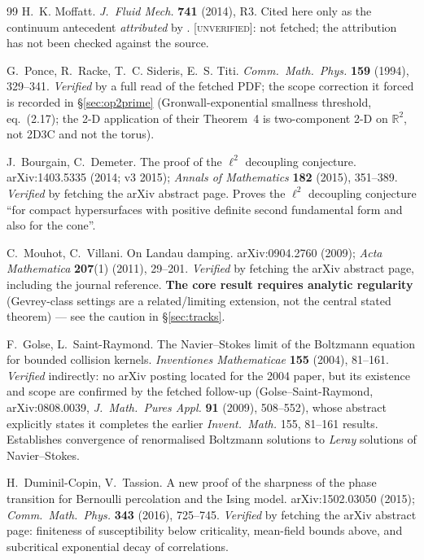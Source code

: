 \documentclass[11pt,a4paper]{article}
\newcommand{\R}{\mathbb{R}}
\theoremstyle{definition}
\theoremstyle{plain}
\begin{document}
\begin{thebibliography}{99}
H.~K. Moffatt.
\newblock \emph{J.~Fluid Mech.} \textbf{741} (2014), R3.
\newblock Cited here only as the continuum antecedent \emph{attributed} by
\cite{biferale-buzzicotti-linkmann}. \textsc{[unverified]}: not fetched; the attribution has not
been checked against the source.

G.~Ponce, R.~Racke, T.~C. Sideris, E.~S. Titi.
\newblock \emph{Comm.\ Math.\ Phys.} \textbf{159} (1994), 329--341.
\newblock \emph{Verified} by a full read of the fetched PDF; the scope correction it forced is
recorded in \S\ref{sec:op2prime} (Gronwall-exponential smallness threshold, eq.~(2.17); the 2-D
application of their Theorem~4 is two-component 2-D on $\R^2$, not 2D3C and not the torus).

J.~Bourgain, C.~Demeter.
\newblock The proof of the $\ell^2$ decoupling conjecture.
\newblock arXiv:1403.5335 (2014; v3 2015); \emph{Annals of Mathematics} \textbf{182} (2015),
351--389.
\newblock \emph{Verified} by fetching the arXiv abstract page. Proves the $\ell^2$ decoupling
conjecture ``for compact hypersurfaces with positive definite second fundamental form and
also for the cone''.

C.~Mouhot, C.~Villani.
\newblock On Landau damping.
\newblock arXiv:0904.2760 (2009); \emph{Acta Mathematica} \textbf{207}(1) (2011), 29--201.
\newblock \emph{Verified} by fetching the arXiv abstract page, including the journal
reference. \textbf{The core result requires analytic regularity} (Gevrey-class settings are
a related/limiting extension, not the central stated theorem) --- see the caution in
\S\ref{sec:tracks}.

F.~Golse, L.~Saint-Raymond.
\newblock The Navier--Stokes limit of the Boltzmann equation for bounded collision kernels.
\newblock \emph{Inventiones Mathematicae} \textbf{155} (2004), 81--161.
\newblock \emph{Verified} indirectly: no arXiv posting located for the 2004 paper, but its
existence and scope are confirmed by the fetched follow-up (Golse--Saint-Raymond,
arXiv:0808.0039, \emph{J.\ Math.\ Pures Appl.} \textbf{91} (2009), 508--552), whose abstract
explicitly states it completes the earlier \emph{Invent.\ Math.} 155, 81--161 results.
Establishes convergence of renormalised Boltzmann solutions to \emph{Leray} solutions of
Navier--Stokes.

H.~Duminil-Copin, V.~Tassion.
\newblock A new proof of the sharpness of the phase transition for Bernoulli percolation and
the Ising model.
\newblock arXiv:1502.03050 (2015); \emph{Comm.\ Math.\ Phys.} \textbf{343} (2016), 725--745.
\newblock \emph{Verified} by fetching the arXiv abstract page: finiteness of susceptibility
below criticality, mean-field bounds above, and subcritical exponential decay of
correlations.


\end{thebibliography}
\end{document}
